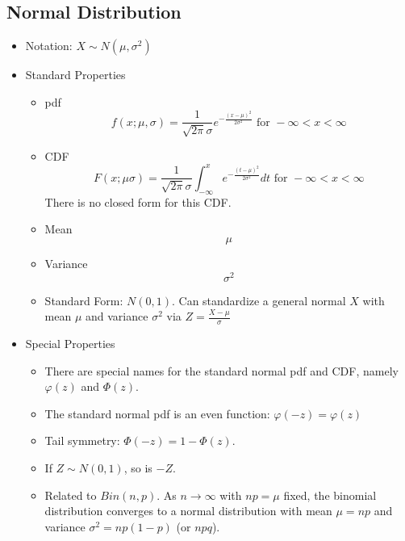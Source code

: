 \documentclass[12pt]{article} %
\begin{document}
\subsection{Normal Distribution}
\begin{itemize}
\item Notation: $X\sim N(\mu,\sigma^2)$

\item Standard Properties

\begin{minipage}{3.5in}
\begin{itemize}[label=$\star$]
\item pdf $$f(x;\mu,\sigma) = \frac1{\sqrt{2\pi}\sigma} e^{-\frac{(x-\mu)^2}{2\sigma^2}} \textrm{ for } -\infty<x<\infty$$
\item CDF $$F(x;\mu\sigma) = \frac1{\sqrt{2\pi}\sigma} \int_{-\infty}^{x}e^{-\frac{(t-\mu)^2}{2\sigma^2}} dt \textrm{ for } -\infty<x<\infty$$
There is no closed form for this CDF.
\end{itemize}
\end{minipage}
\hspace{1in}
\begin{minipage}{2.5in}
\begin{itemize}[label=$\star$]
\item Mean $$\mu$$
\item Variance $$\sigma^2$$
\item Standard Form: $N(0,1)$. Can standardize a general normal $X$ with mean $\mu$ and variance $\sigma^2$ via $Z=\frac{X-\mu}{\sigma}$
\end{itemize}
\end{minipage}
\item Special Properties
\begin{itemize}[label=$\star$]
\item There are special names for the standard normal pdf and CDF, namely $\varphi(z)$ and $\Phi(z)$.
\item The standard normal pdf is an even function: $\varphi(-z) = \varphi(z)$
\item Tail symmetry: $\Phi(-z) = 1-\Phi(z)$.
\item If $Z\sim N(0,1)$, so is $-Z$.
\item Related to $Bin(n,p)$. As $n\rightarrow \infty$ with $np=\mu$ fixed, the binomial distribution converges to a normal distribution with mean $\mu = np$ and variance $\sigma^2 = np(1-p)$ (or $npq$).
\end{itemize}

\end{itemize}
\end{document}
